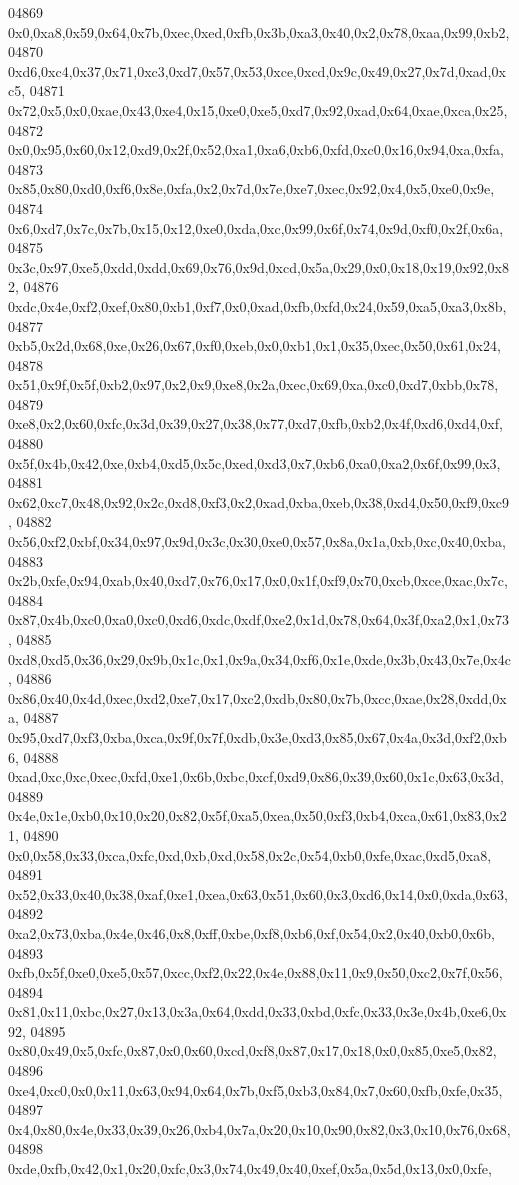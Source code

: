 \begin{DoxyCode}
04869   0x0,0xa8,0x59,0x64,0x7b,0xec,0xed,0xfb,0x3b,0xa3,0x40,0x2,0x78,0xaa,0x99,0xb2,
04870   0xd6,0xc4,0x37,0x71,0xc3,0xd7,0x57,0x53,0xce,0xcd,0x9c,0x49,0x27,0x7d,0xad,0xc5,
04871   0x72,0x5,0x0,0xae,0x43,0xe4,0x15,0xe0,0xe5,0xd7,0x92,0xad,0x64,0xae,0xca,0x25,
04872   0x0,0x95,0x60,0x12,0xd9,0x2f,0x52,0xa1,0xa6,0xb6,0xfd,0xc0,0x16,0x94,0xa,0xfa,
04873   0x85,0x80,0xd0,0xf6,0x8e,0xfa,0x2,0x7d,0x7e,0xe7,0xec,0x92,0x4,0x5,0xe0,0x9e,
04874   0x6,0xd7,0x7c,0x7b,0x15,0x12,0xe0,0xda,0xc,0x99,0x6f,0x74,0x9d,0xf0,0x2f,0x6a,
04875   0x3c,0x97,0xe5,0xdd,0xdd,0x69,0x76,0x9d,0xcd,0x5a,0x29,0x0,0x18,0x19,0x92,0x82,
04876   0xdc,0x4e,0xf2,0xef,0x80,0xb1,0xf7,0x0,0xad,0xfb,0xfd,0x24,0x59,0xa5,0xa3,0x8b,
04877   0xb5,0x2d,0x68,0xe,0x26,0x67,0xf0,0xeb,0x0,0xb1,0x1,0x35,0xec,0x50,0x61,0x24,
04878   0x51,0x9f,0x5f,0xb2,0x97,0x2,0x9,0xe8,0x2a,0xec,0x69,0xa,0xc0,0xd7,0xbb,0x78,
04879   0xe8,0x2,0x60,0xfc,0x3d,0x39,0x27,0x38,0x77,0xd7,0xfb,0xb2,0x4f,0xd6,0xd4,0xf,
04880   0x5f,0x4b,0x42,0xe,0xb4,0xd5,0x5c,0xed,0xd3,0x7,0xb6,0xa0,0xa2,0x6f,0x99,0x3,
04881   0x62,0xc7,0x48,0x92,0x2c,0xd8,0xf3,0x2,0xad,0xba,0xeb,0x38,0xd4,0x50,0xf9,0xc9,
04882   0x56,0xf2,0xbf,0x34,0x97,0x9d,0x3c,0x30,0xe0,0x57,0x8a,0x1a,0xb,0xc,0x40,0xba,
04883   0x2b,0xfe,0x94,0xab,0x40,0xd7,0x76,0x17,0x0,0x1f,0xf9,0x70,0xcb,0xce,0xac,0x7c,
04884   0x87,0x4b,0xc0,0xa0,0xc0,0xd6,0xdc,0xdf,0xe2,0x1d,0x78,0x64,0x3f,0xa2,0x1,0x73,
04885   0xd8,0xd5,0x36,0x29,0x9b,0x1c,0x1,0x9a,0x34,0xf6,0x1e,0xde,0x3b,0x43,0x7e,0x4c,
04886   0x86,0x40,0x4d,0xec,0xd2,0xe7,0x17,0xc2,0xdb,0x80,0x7b,0xcc,0xae,0x28,0xdd,0xa,
04887   0x95,0xd7,0xf3,0xba,0xca,0x9f,0x7f,0xdb,0x3e,0xd3,0x85,0x67,0x4a,0x3d,0xf2,0xb6,
04888   0xad,0xc,0xc,0xec,0xfd,0xe1,0x6b,0xbc,0xcf,0xd9,0x86,0x39,0x60,0x1c,0x63,0x3d,
04889   0x4e,0x1e,0xb0,0x10,0x20,0x82,0x5f,0xa5,0xea,0x50,0xf3,0xb4,0xca,0x61,0x83,0x21,
04890   0x0,0x58,0x33,0xca,0xfc,0xd,0xb,0xd,0x58,0x2c,0x54,0xb0,0xfe,0xac,0xd5,0xa8,
04891   0x52,0x33,0x40,0x38,0xaf,0xe1,0xea,0x63,0x51,0x60,0x3,0xd6,0x14,0x0,0xda,0x63,
04892   0xa2,0x73,0xba,0x4e,0x46,0x8,0xff,0xbe,0xf8,0xb6,0xf,0x54,0x2,0x40,0xb0,0x6b,
04893   0xfb,0x5f,0xe0,0xe5,0x57,0xcc,0xf2,0x22,0x4e,0x88,0x11,0x9,0x50,0xc2,0x7f,0x56,
04894   0x81,0x11,0xbc,0x27,0x13,0x3a,0x64,0xdd,0x33,0xbd,0xfc,0x33,0x3e,0x4b,0xe6,0x92,
04895   0x80,0x49,0x5,0xfc,0x87,0x0,0x60,0xcd,0xf8,0x87,0x17,0x18,0x0,0x85,0xe5,0x82,
04896   0xe4,0xc0,0x0,0x11,0x63,0x94,0x64,0x7b,0xf5,0xb3,0x84,0x7,0x60,0xfb,0xfe,0x35,
04897   0x4,0x80,0x4e,0x33,0x39,0x26,0xb4,0x7a,0x20,0x10,0x90,0x82,0x3,0x10,0x76,0x68,
04898   0xde,0xfb,0x42,0x1,0x20,0xfc,0x3,0x74,0x49,0x40,0xef,0x5a,0x5d,0x13,0x0,0xfe,

\end{DoxyCode}
